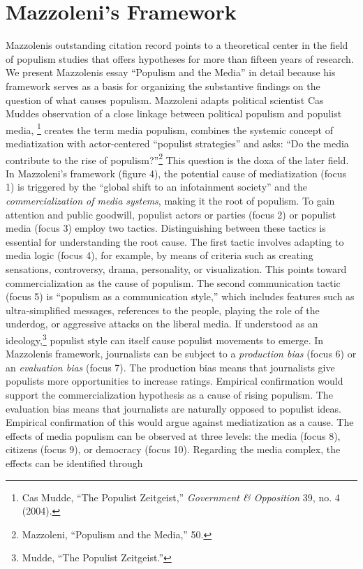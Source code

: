 \documentclass{tufte-handout}
\begin{document}
\hypertarget{mazzolenis-framework}{%
\section{Mazzoleni's Framework}\label{mazzolenis-framework}}

Mazzoleni\textquotesingle s outstanding citation record points to a
theoretical center in the field of populism studies that offers
hypotheses for more than fifteen years of research. We present
Mazzoleni\textquotesingle s essay ``Populism and the Media'' in detail
because his framework serves as a basis for organizing the substantive
findings on the question of what causes populism. Mazzoleni adapts
political scientist Cas Mudde\textquotesingle s observation of a close
linkage between political populism and populist media, \footnote{Cas
  Mudde, ``The Populist Zeitgeist,'' \emph{Government \& Opposition} 39,
  no. 4 (2004).} creates the term media populism, combines the systemic
concept of mediatization with actor-centered ``populist strategies'' and
asks: ``Do the media contribute to the rise of populism?''\footnote{Mazzoleni,
  ``Populism and the Media,'' 50.} This question is the doxa of the
later field. In Mazzoleni's framework (figure 4), the potential cause of
mediatization (focus 1) is triggered by the ``global shift to an
infotainment society'' and the \emph{commercialization of media
systems}, making it the root of populism. To gain attention and public
goodwill, populist actors or parties (focus 2) or populist media (focus 3) employ two tactics. Distinguishing between these tactics is
essential for understanding the root cause. The first tactic involves
adapting to media logic (focus 4), for example, by means of criteria
such as creating sensations, controversy, drama, personality, or
visualization. This points toward commercialization as the cause of
populism. The second communication tactic (focus 5) is ``populism as a
communication style,'' which includes features such as ultra-simplified
messages, references to the people, playing the role of the underdog, or
aggressive attacks on the liberal media. If understood as an
ideology,\footnote{Mudde, ``The Populist Zeitgeist.''} populist style
can itself cause populist movements to emerge. In
Mazzoleni\textquotesingle s framework, journalists can be subject to a
\emph{production bias} (focus 6) or an \emph{evaluation bias} (focus 7).
The production bias means that journalists give populists more
opportunities to increase ratings. Empirical confirmation would support
the commercialization hypothesis as a cause of rising populism. The
evaluation bias means that journalists are naturally opposed to populist
ideas. Empirical confirmation of this would argue against mediatization
as a cause. The effects of media populism can be observed at three
levels: the media (focus 8), citizens (focus 9), or democracy (focus
10). Regarding the media complex, the effects can be identified through
\end{document}
